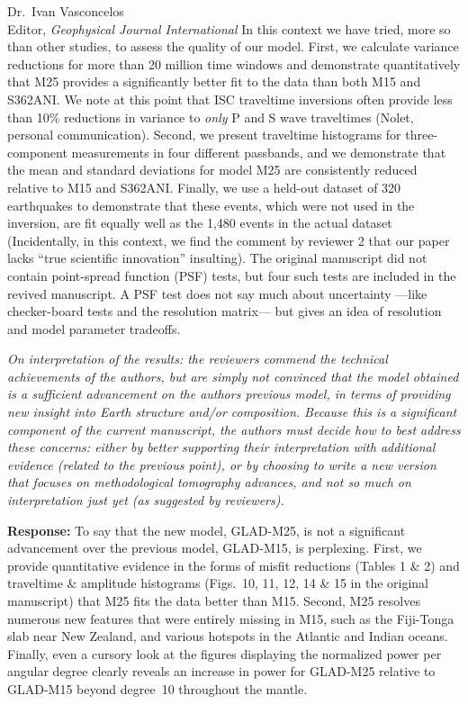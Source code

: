 \documentclass[11pt,a4paper]{letter}
\newcommand{\response}[1]{\textbf{Response:} #1}
\newcommand{\rev}[1]{{\it{#1}}}
\begin{document}
\begin{letter}{Dr.~Ivan Vasconcelos\\
Editor, \textit{Geophysical Journal International}}
{In this context we have tried, more so than other studies, to assess the quality of our model.
First, we calculate variance reductions for more than 20 million time windows and demonstrate quantitatively that M25 provides a significantly better fit to the data than both M15 and S362ANI.
We note at this point that ISC traveltime inversions often provide less than 10\% reductions in variance to \emph{only} P and S wave traveltimes (Nolet, personal communication).
Second, we present traveltime histograms for three-component measurements in four different passbands, and we demonstrate that the mean and standard deviations for model M25 are consistently reduced relative to M15 and S362ANI.
Finally, we use a held-out dataset of 320 earthquakes to demonstrate that these events, which were not used in the inversion, are fit equally well as the 1,480 events in the actual dataset (Incidentally, in this context, we find the comment by reviewer 2 that our paper lacks ``true scientific innovation'' insulting).
The original manuscript did not contain point-spread function (PSF) tests,
but four such tests are included in the revived manuscript.
A PSF test does not say much about uncertainty ---like checker-board tests and the resolution matrix--- but gives an idea of resolution and model parameter tradeoffs.
}

\rev{On interpretation of the results: the reviewers commend the technical achievements of the authors, but are simply not convinced that the model obtained is a sufficient advancement on the authors previous model, in terms of providing new insight into Earth structure and/or composition.
Because this is a significant component of the current manuscript, the authors must decide how to best address these concerns: either by better supporting their interpretation with additional evidence (related to the previous point), or by choosing to write a new version that focuses on methodological tomography advances, and not so much on interpretation just yet (as suggested by reviewers).
}

\response{To say that the new model, GLAD-M25, is not a significant advancement over the previous model, GLAD-M15, is perplexing. First, we provide quantitative evidence in the forms of misfit reductions (Tables 1 \& 2) and traveltime \& amplitude histograms (Figs.~10, 11, 12, 14 \& 15 in the original manuscript) that M25 fits the data better than M15.
Second, M25 resolves numerous new features that were entirely missing in M15, such as the Fiji-Tonga slab near New Zealand, and various hotspots in the Atlantic and Indian oceans.
Finally, even a cursory look at the figures displaying the normalized power per angular degree clearly reveals an increase in power for GLAD-M25 relative to GLAD-M15 beyond degree~10 throughout the mantle.

}
\end{letter}
\end{document}

